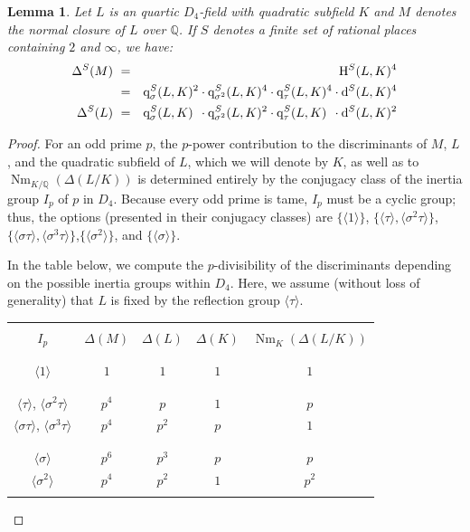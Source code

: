 \documentclass[10pt]{article}
\theoremstyle{plain}
\newtheorem{lemma}[thm]{Lemma}
\theoremstyle{definition}
\theoremstyle{remark}
\def\Disc{{\Delta}}
\def\H{{\rm H}}
\def\bQ{{\mathbb Q}}
\def\bQ{{\mathbb Q}}
\newcommand{\reflection}{\tau}
\newcommand{\D}{{\rm d}}
\newcommand{\q}{{\rm q}}
\DeclareMathOperator{\Nm}{Nm}
\begin{document}
\begin{lemma}\label{lem:Deltas}
Let $L$ is an quartic $D_4$-field with quadratic subfield $K$
and $M$ denotes the normal closure of $L$ over $\bQ$. If $S$ denotes a finite set of rational places containing $2$ and $\infty$, we have:
\begin{eqnarray*}
\Disc^S(M) \ &=& \H^S(L,K)^4 \\&=& \q^S_\sigma(L,K)^2\cdot \q^S_{\sigma^2}(L,K)^4 \cdot \q^S_\tau(L,K)^4 \cdot \D^S(L,K)^4 \\
\Disc^S(L) \  &=& \q^S_\sigma(L,K)^{\phantom 2} \cdot \q^S_{\sigma^2}(L,K)^2 \cdot \q^S_\tau(L,K)^{\phantom 2} \cdot \D^S(L,K)^2 
\end{eqnarray*}
\end{lemma}
\begin{proof}
  For an odd prime $p$, the $p$-power contribution to the
  discriminants of $M$, $L$, and the quadratic subfield of $L$, which
  we will denote by $K$, as well as to $\Nm_{K/\bQ}(\Disc(L/K))$ is
  determined entirely by the conjugacy class of the inertia group
  $I_p$ of $p$ in $D_4$. Because every odd prime is tame, $I_p$ must
  be a cyclic group; thus, the options (presented in their conjugacy classes) are $\{\langle 1 \rangle \}$,
  $\{\langle \tau \rangle,\langle\sigma^2 \tau\rangle\}$, $\{\langle
  \sigma \tau \rangle, \langle\sigma^3 \tau \rangle\}$,$\{\langle
  \sigma^2\rangle\}$, and $\{\langle \sigma \rangle\}$.

In the table below, we compute the $p$-divisibility of the
discriminants depending on the possible inertia groups within
$D_4$. Here, we assume (without loss of generality) that $L$ is fixed
by the reflection group $\langle \reflection \rangle$.
\begin{table}[h!!!!!!]\label{inertiatable}
\begin{center}
\begin{tabular}{|c||c|c|c|c|}
\hline &&&& \\[-10pt]
 $I_p$ &  $\Disc(M)$ &$\Disc(L)$ & $\Disc(K)$ &$\Nm_K(\Disc(L/K))$ \\ \hline &&&&\\[-12pt]
  		\hline &&&&\\[-10pt] 
$\langle1\rangle$ & $1$ & $1$ & $1$ & $1$ \\[-12pt] &&&&\\
\hline &&&& \\[-10pt]
$\langle \tau \rangle$, $\langle \sigma^2 \tau \rangle$ & $p^4$ & $p$ & $1$ & $p$ \\[2pt]
$\langle \sigma\tau \rangle$, $\langle \sigma^3 \tau \rangle$ & $p^4$ & $p^2$ & $p$ & $1$\\[-12pt] &&&&\\
\hline&&&&\\[-10pt]
$\langle \sigma \rangle$ & $p^6$ & $p^3$ & $p$ & $p$\\[2pt]
$\langle \sigma^2 \rangle$ & $p^4$ & $p^2$ & $1$ & $p^2$\\[-12pt] &&&&\\
\hline


\end{tabular}
\end{center}
\end{table}
\end{proof}
\end{document}
